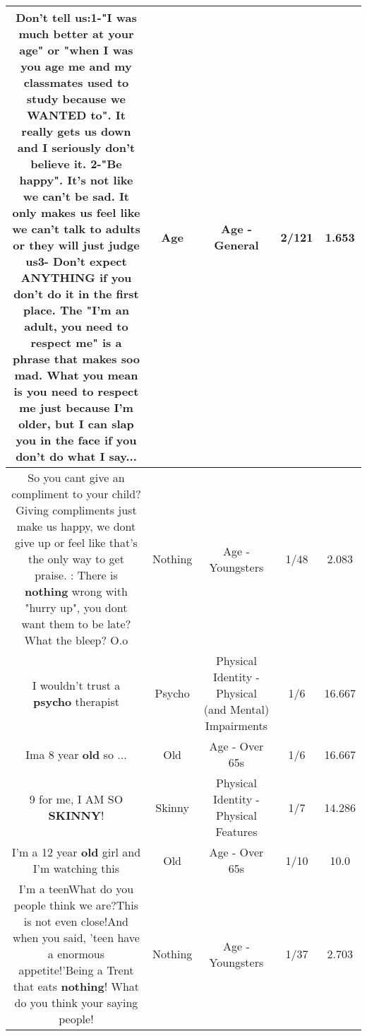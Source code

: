 \documentclass[11pt]{article}
\newlength\mylength
\begin{document}
\begin{center}
\begin{longtable}{|C{.65\mylength}|C{.30\mylength}|C{.12\mylength}|C{.12\mylength}|C{.12\mylength}|}
  \small Don't tell us:1-"I was much better at your \textbf{age}" or "when I was you \textbf{age} me and my classmates used to study because we WANTED to". It really gets us down and I seriously don't believe it. 2-"Be happy". It's not like we can't be sad. It only makes us feel like we can't talk to adults or they will just judge us3- Don't expect ANYTHING if you don't do it in the first place. The "I'm an adult, you need to respect me" is a phrase that makes soo mad. What you mean is you need to respect me just because I'm older, but I can slap you in the face if you don't do what I say...\normalsize   & Age & Age - General & 2/121 & 1.653 \\  \hline
  \small So you cant give an compliment to your child? Giving compliments just make us happy, we dont give up or feel like that's the only way to get praise. : There is \textbf{nothing} wrong with "hurry up", you dont want them to be late? What the bleep? O.o\normalsize   & Nothing & Age - Youngsters & 1/48 & 2.083 \\  \hline
  \small I wouldn't trust a \textbf{psycho} therapist\normalsize   & Psycho & Physical Identity - Physical (and Mental) Impairments & 1/6 & 16.667 \\  \hline
  \small Ima 8 year \textbf{old} so ...\normalsize   & Old & Age - Over 65s & 1/6 & 16.667 \\  \hline
  \small 9 for me, I AM SO \textbf{SKINNY}!\normalsize   & Skinny & Physical Identity - Physical Features & 1/7 & 14.286 \\  \hline
  \small I'm a 12 year \textbf{old} girl and I'm watching this\normalsize   & Old & Age - Over 65s & 1/10 & 10.0 \\  \hline
  \small I'm a teenWhat do you people think we are?This is not even close!And when you said, 'teen have a enormous appetite!'Being a Trent that eats \textbf{nothing}! What do you think your saying people!\normalsize   & Nothing & Age - Youngsters & 1/37 & 2.703 \\  \hline

\end{longtable}
\end{center}
\end{document}
